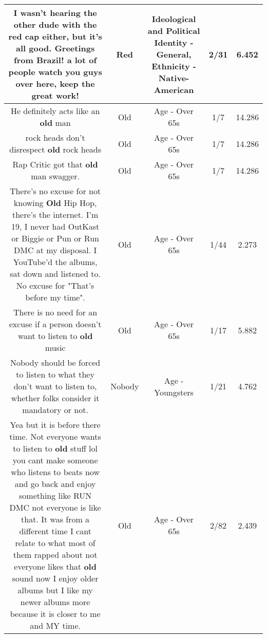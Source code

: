 \documentclass[11pt]{article}
\newlength\mylength
\begin{document}
\begin{center}
\begin{longtable}{|C{.65\mylength}|C{.30\mylength}|C{.12\mylength}|C{.12\mylength}|C{.12\mylength}|}
  \small I wasn't hearing the other dude with the \textbf{r\textbf{ed}} cap either, but it's all good. Greetings from Brazil! a lot of people watch you guys over here, keep the great work!\normalsize   & Red &  Ideological and Political Identity - General, Ethnicity - Native-American & 2/31 & 6.452 \\  \hline
  \small He definitely acts like an \textbf{old} man\normalsize   & Old & Age - Over 65s & 1/7 & 14.286 \\  \hline
  \small rock heads don't disrespect \textbf{old} rock heads\normalsize   & Old & Age - Over 65s & 1/7 & 14.286 \\  \hline
  \small Rap Critic got that \textbf{old} man swagger.\normalsize   & Old & Age - Over 65s & 1/7 & 14.286 \\  \hline
  \small There's no excuse for not knowing \textbf{Old} Hip Hop, there's the internet. I'm 19, I never had OutKast or Biggie or Pun or Run DMC at my disposal. I YouTube'd the albums, sat down and listened to. No excuse for "That's before my time".\normalsize   & Old & Age - Over 65s & 1/44 & 2.273 \\  \hline
  \small There is no need for an excuse if a person doesn't want to listen to \textbf{old} music\normalsize   & Old & Age - Over 65s & 1/17 & 5.882 \\  \hline
  \small Nobody should be forced to listen to what they don't want to listen to, whether folks consider it mandatory or not.\normalsize   & Nobody & Age - Youngsters & 1/21 & 4.762 \\  \hline
  \small Yea but it is before there time. Not everyone wants to listen to \textbf{old} stuff lol you cant make someone who listens to beats now and go back and enjoy something like RUN DMC not everyone is like that. It was from a different time I cant relate to what most of them rapped about not everyone likes that \textbf{old} sound now I enjoy older albums but I like my newer albums more because it is closer to me and MY time.\normalsize   & Old & Age - Over 65s & 2/82 & 2.439 \\  \hline

\end{longtable}
\end{center}
\end{document}
